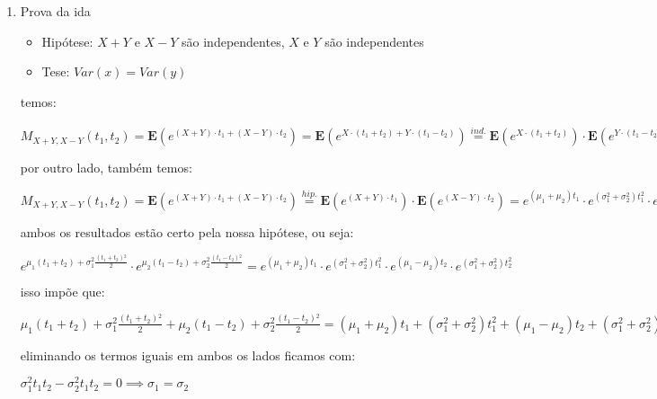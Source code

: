 \documentclass[portuguese]{article}
\begin{document}
\begin{enumerate}
\item Prova da ida

\begin{itemize}
\item Hipótese: $X+Y$ e $X-Y$ são independentes, $X$ e $Y$ são independentes
\item Tese: $Var(x)=Var(y)$
\end{itemize}

temos:


$M_{X+Y,X-Y}(t_{1},t_{2})=\mathbf{E}(e^{(X+Y)\cdot t_{1}+(X-Y)\cdot t_{2}})=\mathbf{E}(e^{X\cdot(t_{1}+t_{2})+Y\cdot(t_{1}-t_{2})})\overset{ind.}{=}\mathbf{E}(e^{X\cdot(t_{1}+t_{2})})\cdot\mathbf{E}(e^{Y\cdot(t_{1}-t_{2})})=e^{\mu_{1}(t_{1}+t_{2})+\sigma_{1}^{2}\frac{(t_{1}+t_{2}){}^{2}}{2}}\cdot e^{\mu_{2}(t_{1}-t_{2})+\sigma_{2}^{2}\frac{(t_{1}-t_{2}){}^{2}}{2}}$


por outro lado, também temos:


$M_{X+Y,X-Y}(t_{1},t_{2})=\mathbf{E}(e^{(X+Y)\cdot t_{1}+(X-Y)\cdot t_{2}})\overset{hip.}{=}\mathbf{E}(e^{(X+Y)\cdot t_{1}})\cdot\mathbf{E}(e^{(X-Y)\cdot t_{2}})=e^{(\mu_{1}+\mu_{2})t_{1}}\cdot e^{(\sigma_{1}^{2}+\sigma_{2}^{2})t_{1}^{2}}\cdot e^{(\mu_{1}-\mu_{2})t_{2}}\cdot e^{(\sigma_{1}^{2}+\sigma_{2}^{2})t_{2}^{2}}$


ambos os resultados estão certo pela nossa hipótese, ou seja:


$e^{\mu_{1}(t_{1}+t_{2})+\sigma_{1}^{2}\frac{(t_{1}+t_{2}){}^{2}}{2}}\cdot e^{\mu_{2}(t_{1}-t_{2})+\sigma_{2}^{2}\frac{(t_{1}-t_{2}){}^{2}}{2}}=e^{(\mu_{1}+\mu_{2})t_{1}}\cdot e^{(\sigma_{1}^{2}+\sigma_{2}^{2})t_{1}^{2}}\cdot e^{(\mu_{1}-\mu_{2})t_{2}}\cdot e^{(\sigma_{1}^{2}+\sigma_{2}^{2})t_{2}^{2}}$


isso impõe que:


$\mu_{1}(t_{1}+t_{2})+\sigma_{1}^{2}\frac{(t_{1}+t_{2}){}^{2}}{2}+\mu_{2}(t_{1}-t_{2})+\sigma_{2}^{2}\frac{(t_{1}-t_{2}){}^{2}}{2}=(\mu_{1}+\mu_{2})t_{1}+(\sigma_{1}^{2}+\sigma_{2}^{2})t_{1}^{2}+(\mu_{1}-\mu_{2})t_{2}+(\sigma_{1}^{2}+\sigma_{2}^{2})t_{2}^{2}$


eliminando os termos iguais em ambos os lados ficamos com:


$\sigma_{1}^{2}t_{1}t_{2}-\sigma_{2}^{2}t_{1}t_{2}=0\implies\sigma_{1}=\sigma_{2}$

\end{enumerate}

\subsection*{\textcompwordmark{}}
\end{document}

